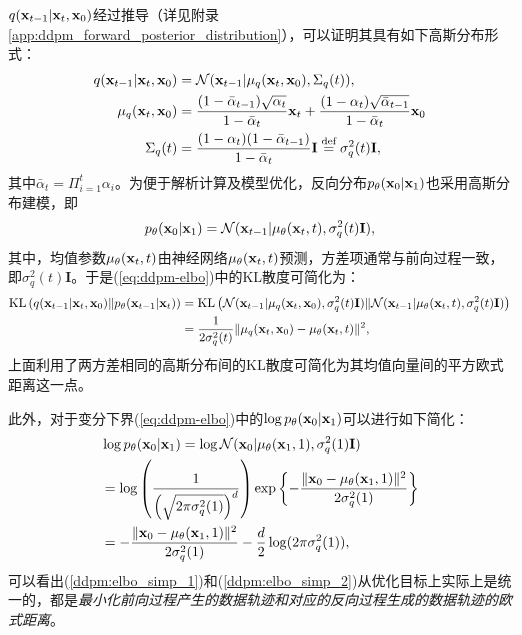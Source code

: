 \documentclass[11pt,a4paper,UTF8]{ctexart}
\begin{document}
$q(\mathbf{x}_{t-1}|\mathbf{x}_t,\mathbf{x}_0)$经过推导（详见附录\ref{app:ddpm_forward_posterior_distribution}），可以证明其具有如下高斯分布形式：
\begin{align}
\begin{split}
    q(\mathbf{x}_{t-1}|\mathbf{x}_t,\mathbf{x}_0) &= \mathcal{N}(\mathbf{x}_{t-1}|\mu_q(\mathbf{x}_t,\mathbf{x}_0),\Sigma_q(t)),\\
    \mu_q(\mathbf{x}_t,\mathbf{x}_0) &= \frac{(1-\bar{\alpha}_{t-1})\sqrt{\alpha_t}}{1-\bar{\alpha}_t}\mathbf{x}_t + \frac{(1-\alpha_t)\sqrt{\bar{\alpha}_{t-1}}}{1-\bar{\alpha}_t}\mathbf{x}_0 \\
    \Sigma_q(t) &= \frac{(1-\alpha_t)(1-\bar{\alpha}_{t-1})}{1-\bar{\alpha}_t}\mathbf{I}  \stackrel{\text{def}}{=} \sigma_q^2(t)\mathbf{I},
\end{split}
\label{eq:reverse-posterior-main}
\end{align}
其中$\bar{\alpha}_t=\Pi_{i=1}^t \alpha_i$。为便于解析计算及模型优化，反向分布$p_{\theta}(\mathbf{x}_0|\mathbf{x}_1)$也采用高斯分布建模，即
\begin{equation*}
    p_{\theta}(\mathbf{x}_0|\mathbf{x}_1)=\mathcal{N}(\mathbf{x}_{t-1}| \mu_{\theta}(\mathbf{x}_t,t), \sigma_q^2(t)\mathbf{I}),
\end{equation*}
其中，均值参数$\mu_\theta(\mathbf{x}_t,t)$由神经网络$\mu_{\theta}(\mathbf{x}_t,t)$预测，方差项通常与前向过程一致，即$\sigma_q^2(t)\mathbf{I}$。于是(\ref{eq:ddpm-elbo})中的KL散度可简化为：
\begin{align}
\begin{split}
    \text{KL}\left(q(\mathbf{x}_{t-1}|\mathbf{x}_t,\mathbf{x}_0) \| p_{\theta}(\mathbf{x}_{t-1}|\mathbf{x}_t)\right) &= \text{KL} \left(\mathcal{N}(\mathbf{x}_{t-1}|\mu_q(\mathbf{x}_t,\mathbf{x}_0),\sigma_q^2(t)\mathbf{I}) \| \mathcal{N}(\mathbf{x}_{t-1}| \mu_{\theta}(\mathbf{x}_t,t), \sigma_q^2(t)\mathbf{I})\right) \\
    &= \frac{1}{2\sigma_q^2(t)} \| \mu_q(\mathbf{x}_t,\mathbf{x}_0) - \mu_{\theta}(\mathbf{x}_t,t) \|^2,
\label{ddpm:elbo_simp_1}
\end{split}
\end{align}
上面利用了两方差相同的高斯分布间的KL散度可简化为其均值向量间的平方欧式距离这一点。

此外，对于变分下界(\ref{eq:ddpm-elbo})中的$\log p_{\theta}(\mathbf{x}_0|\mathbf{x}_1)$可以进行如下简化：
\begin{align}
\begin{split}
&\log p_{\theta}(\mathbf{x}_0|\mathbf{x}_1) = \log \mathcal{N}(\mathbf{x}_0| \mu_{\theta}(\mathbf{x}_1,1),\sigma_q^2(1)\mathbf{I}) \\
&= \log \left( \frac{1}{\left(\sqrt{2\pi\sigma_q^2(1)} \right)^d} \right)\exp \left\{-\frac{\|\mathbf{x}_0 -\mu_{\theta}(\mathbf{x}_1,1) \|^2}{2\sigma_q^2(1)} \right\} \\
&= -\frac{\|\mathbf{x}_0 -\mu_{\theta}(\mathbf{x}_1,1) \|^2}{2\sigma_q^2(1)} -\frac{d}{2}\log (2\pi\sigma_q^2(1)),
\label{ddpm:elbo_simp_2}
\end{split}
\end{align}
可以看出(\ref{ddpm:elbo_simp_1})和(\ref{ddpm:elbo_simp_2})从优化目标上实际上是统一的，都是\emph{最小化前向过程产生的数据轨迹和对应的反向过程生成的数据轨迹的欧式距离}。
\end{document}
